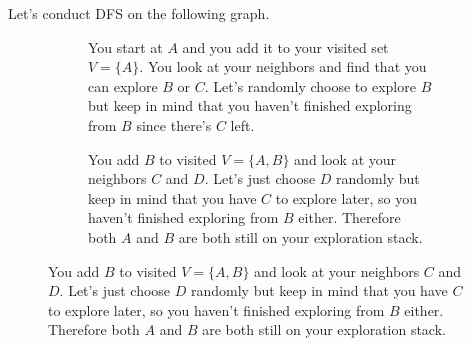   \begin{example}
    \label{ex:dfs-walkthrough}
    Let's conduct DFS on the following graph. 

    \begin{figure}[H]
      \centering
      \begin{subfigure}[b]{0.48\textwidth}
        \centering
        \caption{You start at $A$ and you add it to your visited set $V = \{A\}$. You look at your neighbors and find that you can explore $B$ or $C$. Let's randomly choose to explore $B$ but keep in mind that you haven't finished exploring from $B$ since there's $C$ left. }
      \end{subfigure}
      \hfill 
      \begin{subfigure}[b]{0.48\textwidth}
        \centering
        \caption{You add $B$ to visited $V = \{A, B\}$ and look at your neighbors $C$ and $D$. Let's just choose $D$ randomly but keep in mind that you have $C$ to explore later, so you haven't finished exploring from $B$ either. Therefore both $A$ and $B$ are both still on your exploration stack.}
      \end{subfigure}


\end{figure}
\end{example}
